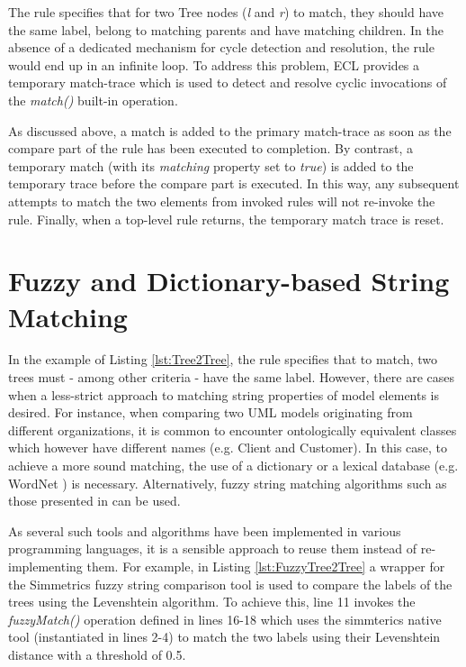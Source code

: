 The rule specifies that for two Tree nodes (\emph{l} and \emph{r}) to match, they should have the same label, belong to matching parents and have matching children. In the absence of a dedicated mechanism for cycle detection and resolution, the rule would end up in an infinite loop. To address this problem, ECL provides a temporary match-trace which is used to detect and resolve cyclic invocations of the \emph{match()} built-in operation.

As discussed above, a match is added to the primary match-trace as soon as the compare part of the rule has been executed to completion. By contrast, a temporary match (with its \emph{matching} property set to \emph{true}) is added to the temporary trace before the compare part is executed. In this way, any subsequent attempts to match the two elements from invoked rules will not re-invoke the rule. Finally, when a top-level rule returns, the temporary match trace is reset.

\section{Fuzzy and Dictionary-based String Matching}
\label{sec:FuzzyComparison}

In the example of Listing \ref{lst:Tree2Tree}, the rule specifies that to match, two trees must - among other criteria - have the same label. However, there are cases when a less-strict approach to matching string properties of model elements is desired. For instance, when comparing two UML models originating from different organizations, it is common to encounter ontologically equivalent classes which however have different names (e.g. Client and Customer). In this case, to achieve a more sound matching, the use of a dictionary or a lexical database (e.g. WordNet \cite{Wordnet}) is necessary. Alternatively, fuzzy string matching algorithms such as those presented in \cite{FuzzyStringMatching} can be used.

As several such tools and algorithms have been implemented in various programming languages, it is a sensible approach to reuse them instead of re-implementing them. For example, in Listing \ref{lst:FuzzyTree2Tree} a wrapper for the Simmetrics \cite{Simmetrics} fuzzy string comparison tool is used to compare the labels of the trees using the Levenshtein \cite{Levenshtein} algorithm. To achieve this, line 11 invokes the \emph{fuzzyMatch()} operation defined in lines 16-18 which uses the simmterics native tool (instantiated in lines 2-4) to match the two labels using their Levenshtein distance with a threshold of 0.5.

